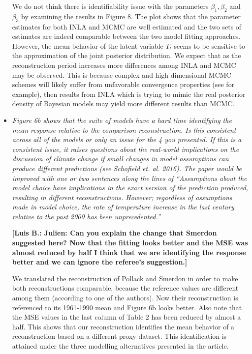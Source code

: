 \documentclass[11pt]{article}
\newcommand{\lb}[1]{\color{ForestGreen}\textbf{[Luis B.: #1]}\normalcolor}
\begin{document}
\begin{itemize}
We do not think there is identifiability issue with the parameters
\(\beta_1,\beta_2\) and \(\beta_3\) by examining the results in Figure 8. The plot shows that the parameter estimates for both INLA and MCMC are well estimated and the two sets of estimates are indeed comparable between the two model fitting approaches.
However, the mean behavior of the latent variable
\(T_t\) seems to be sensitive to the approximation of the
joint posterior distribution. We expect that as the reconstruction period increases more differences among INLA and MCMC may be observed. This is because 
 complex and high dimensional MCMC schemes will likely suffer from unfavorable
 convergence properties (see \cite{Rajaratnam2015} for example), then results
 from INLA which is trying to mimic the real posterior density of Bayesian
 models may yield more different results than MCMC.
 
\item \textit{Figure 6b shows that the suite of models have a hard time identifying
    the mean response relative to the comparison reconstruction. Is this
    consistent across all of the models or only an issue for the 4 you
    presented. If this is a consistent issue, it raises questions about the
    real-world implications on the discussion of climate change if small changes
    in model assumptions can produce different predictions (see Schofield et.
    al. 2016). The paper would be improved with one or two sentences along the
    lines of ``Assumptions about the model choice have implications in the exact
    version of the prediction produced, resulting in different reconstructions.
    However; regardless of assumptions made in model choice, the rate of
    temperature increase in the last century relative to the past 2000 has been unprecedented.''}

\lb{Julien: Can you explain the change that Smerdon suggested here? Now that the fitting looks better and the MSE was almost reduced by
  half I think that we are identifying the response better and we can ignore the
referee's suggestion.}  

We translated the reconstruction of Pollack and Smerdon in order to make both
reconstructions comparable, because the reference values are different among
them (according to one of the authors). Now their reconstruction is referenced
to its 1961-1990 mean and Figure 6b looks better. Also note that the MSE values in the
last column of Table 2 has been reduced by almost a half. This shows that our
reconstruction identifies the mean behavior of a reconstruction based on a
different proxy dataset. This identification is attained under the three
modelling alternatives presented in the article.  


\end{itemize}
\end{document}
